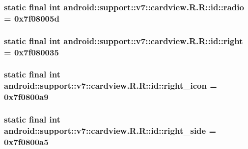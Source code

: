 \hypertarget{classandroid_1_1support_1_1v7_1_1cardview_1_1_r_1_1id_cc36daeb8bf4c47981947c85ee9db056}{
\subsubsection[{radio}]{\setlength{\rightskip}{0pt plus 5cm}static final int android::support::v7::cardview.R.R::id::radio = 0x7f08005d}}
\label{classandroid_1_1support_1_1v7_1_1cardview_1_1_r_1_1id_cc36daeb8bf4c47981947c85ee9db056}


\hypertarget{classandroid_1_1support_1_1v7_1_1cardview_1_1_r_1_1id_78cc4626802996ff9a0e85e71883bc06}{
\subsubsection[{right}]{\setlength{\rightskip}{0pt plus 5cm}static final int android::support::v7::cardview.R.R::id::right = 0x7f080035}}
\label{classandroid_1_1support_1_1v7_1_1cardview_1_1_r_1_1id_78cc4626802996ff9a0e85e71883bc06}


\hypertarget{classandroid_1_1support_1_1v7_1_1cardview_1_1_r_1_1id_218687857e9688f1ccd4a44ad1a6373c}{
\subsubsection[{right\_\-icon}]{\setlength{\rightskip}{0pt plus 5cm}static final int android::support::v7::cardview.R.R::id::right\_\-icon = 0x7f0800a9}}
\label{classandroid_1_1support_1_1v7_1_1cardview_1_1_r_1_1id_218687857e9688f1ccd4a44ad1a6373c}


\hypertarget{classandroid_1_1support_1_1v7_1_1cardview_1_1_r_1_1id_bb75bb4fa82f9ad19eedc00266ed7ac8}{
\subsubsection[{right\_\-side}]{\setlength{\rightskip}{0pt plus 5cm}static final int android::support::v7::cardview.R.R::id::right\_\-side = 0x7f0800a5}}
\label{classandroid_1_1support_1_1v7_1_1cardview_1_1_r_1_1id_bb75bb4fa82f9ad19eedc00266ed7ac8}


